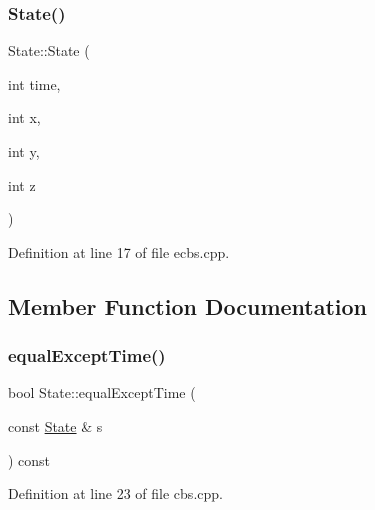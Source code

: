 \mbox{\label{struct_state_acd7182e04da1e5c712fdda9a0dd329bd}} 
\subsubsection{\texorpdfstring{State()}{State()}\hspace{0.1cm}{\footnotesize\ttfamily [8/8]}}
{\footnotesize\ttfamily State\+::\+State (\begin{DoxyParamCaption}\item[{int}]{time,  }\item[{int}]{x,  }\item[{int}]{y,  }\item[{int}]{z }\end{DoxyParamCaption})\hspace{0.3cm}{\ttfamily [inline]}}



Definition at line 17 of file ecbs.\+cpp.



\subsection{Member Function Documentation}
\mbox{\label{struct_state_a6d429325c836ad81fd1d95eec0051663}} 
\subsubsection{\texorpdfstring{equal\+Except\+Time()}{equalExceptTime()}\hspace{0.1cm}{\footnotesize\ttfamily [1/2]}}
{\footnotesize\ttfamily bool State\+::equal\+Except\+Time (\begin{DoxyParamCaption}\item[{const \hyperlink{struct_state}{State} \&}]{s }\end{DoxyParamCaption}) const\hspace{0.3cm}{\ttfamily [inline]}}



Definition at line 23 of file cbs.\+cpp.

